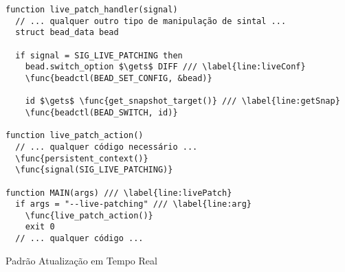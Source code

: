\begin{pseudocode}
\begin{lstlisting}[language=pseudocode, style=pseudocode]
function live_patch_handler(signal)
  // ... qualquer outro tipo de manipulação de sintal ...
  struct bead_data bead

  if signal = SIG_LIVE_PATCHING then
    bead.switch_option $\gets$ DIFF /// \label{line:liveConf}
    \func{beadctl(BEAD_SET_CONFIG, &bead)}

    id $\gets$ \func{get_snapshot_target()} /// \label{line:getSnap}
    \func{beadctl(BEAD_SWITCH, id)}

function live_patch_action()
  // ... qualquer código necessário ...
  \func{persistent_context()}
  \func{signal(SIG_LIVE_PATCHING)}

function MAIN(args) /// \label{line:livePatch}
  if args = "--live-patching" /// \label{line:arg}
    \func{live_patch_action()}
    exit 0
  // ... qualquer código ...
\end{lstlisting}

  \caption{Padrão Atualização em Tempo Real}
  \label{alg:livePatch}
\end{pseudocode}
